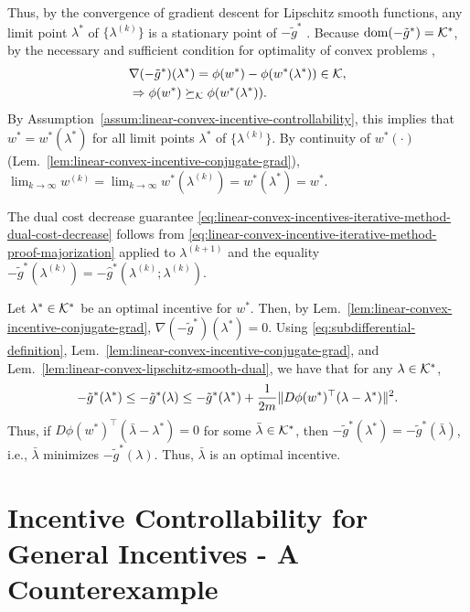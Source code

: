 Thus, by the convergence of gradient descent for Lipschitz smooth functions, any limit point $\lambda^*$ of $\{\lambda^{(k)} \}$ is a stationary point of $-\tilde{g}^*$ \cite[Prop.~2.3.2]{bertsekas1997nonlinear}.
Because $\operatorname{dom}(-\tilde{g}^*) = \mathcal{K}^*$, by the necessary and sufficient condition for optimality of convex problems \cite[Prop.~2.1.2(a)]{bertsekas1997nonlinear},
\begin{align*}
    & \nabla (-\tilde{g}^*)(\lambda^*) = \phi(w^*) - \phi(w^*(\lambda^*)) \in \mathcal{K}, \\
    & \Rightarrow \phi(w^*) \succeq_{\mathcal{K}} \phi(w^*(\lambda^*)).
\end{align*}
By Assumption~\ref{assum:linear-convex-incentive-controllability}, this implies that $w^* = w^*(\lambda^*)$ for all limit points $\lambda^*$ of $\{ \lambda^{(k)}\}$.
By continuity of $w^*(\cdot)$ (Lem.~\ref{lem:linear-convex-incentive-conjugate-grad}), $\lim_{k \rightarrow \infty} w^{(k)} = \lim_{k \rightarrow \infty} w^*(\lambda^{(k)}) = w^*(\lambda^*) = w^*$.

The dual cost decrease guarantee \eqref{eq:linear-convex-incentives-iterative-method-dual-cost-decrease} follows from \eqref{eq:linear-convex-incentive-iterative-method-proof-majorization} applied to $\lambda^{(k+1)}$ and the equality $-\tilde{g}^*(\lambda^{(k)}) = -\hat{g}^*(\lambda^{(k)}; \lambda^{(k)})$.

Let $\lambda^* \in \mathcal{K}^*$ be an optimal incentive for $w^*$.
Then, by Lem.~\ref{lem:linear-convex-incentive-conjugate-grad}, $\nabla (-\tilde{g}^*)(\lambda^*) = 0$.
Using \eqref{eq:subdifferential-definition}, Lem.~\ref{lem:linear-convex-incentive-conjugate-grad}, and Lem.~\ref{lem:linear-convex-lipschitz-smooth-dual}, we have that for any $\lambda \in \mathcal{K}^*$,
\begin{equation*}
-\tilde{g}^*(\lambda^*) \leq -\tilde{g}^*(\lambda) \leq -\tilde{g}^*(\lambda^*) + \frac{1}{2m} \lVert D\phi(w^*)^\top (\lambda - \lambda^*) \rVert^2.
\end{equation*}
Thus, if $D\phi(w^*)^\top (\bar{\lambda} - \lambda^*) = 0$ for some $\bar{\lambda} \in \mathcal{K}^*$, then $-\tilde{g}^*(\lambda^*) = -\tilde{g}^*(\bar{\lambda})$, i.e., $\bar{\lambda}$ minimizes $-\tilde{g}^*(\lambda)$.
Thus, $\bar{\lambda}$ is an optimal incentive.


\iffalse
\section{Incentive Controllability for General Incentives - A Counterexample}
\label{app:incentive-controllability-for-general-incentives-a-counterexample}

